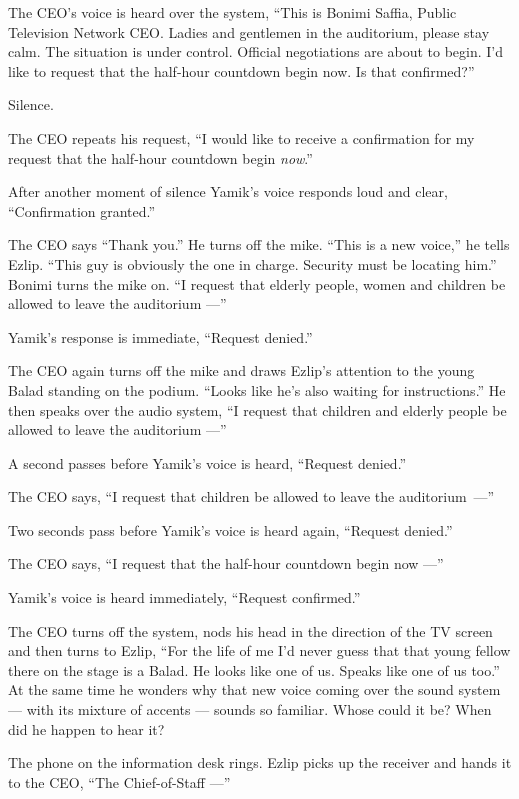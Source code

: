 \documentclass[twoside,11pt]{book}
\begin{document}
The CEO's voice is heard over the system, ``This is Bonimi Saffia, Public Television Network CEO. Ladies
and gentlemen in the auditorium, please stay calm. The situation is under control. Official negotiations are about
to begin. I'd like to request that the
half-hour countdown begin now. Is that confirmed?''

Silence.

The CEO repeats his request, ``I would like to receive a confirmation for my request that the half-hour
countdown begin \textit{now}.''

After another moment of silence Yamik's voice responds loud and clear, ``Confirmation
granted.''

The CEO says ``Thank you.'' He turns off the mike. ``This is a new voice,'' he
tells Ezlip. ``This guy is{ }obviously the one in charge. Security must
be{ }locating him.'' Bonimi turns the mike on. ``I request that elderly
people, women and children be allowed to leave the auditorium ---''

Yamik's response is immediate, ``Request denied.''

The CEO again turns off the mike and draws Ezlip's attention to the young Balad standing on the podium. ``Looks like
he's also waiting for instructions.'' He then speaks over the audio system, ``I request that
children and elderly people be allowed to leave the auditorium ---''

A second passes before Yamik's voice is heard, ``Request denied.''

The CEO says, ``I request that children be allowed to leave the auditorium~---''

Two seconds pass before Yamik's voice is heard again, ``Request denied.''

The CEO says, ``I request that the half-hour countdown begin now ---''

Yamik's voice is heard immediately, ``Request confirmed.''

The CEO turns off the system, nods his head in the direction of the TV screen and then turns
to Ezlip, ``For the life of me I'd never guess that that young
fellow there on the stage is a Balad. He looks like one of us. Speaks like one of us too.'' At the
same time he wonders why that new voice coming over the sound system --- with its mixture of accents --- sounds so
familiar. Whose could it be? When did he happen to hear it?

The phone on the information desk rings.  Ezlip picks up the receiver and hands it to the CEO, ``The
Chief-of-Staff ---''
\end{document}
